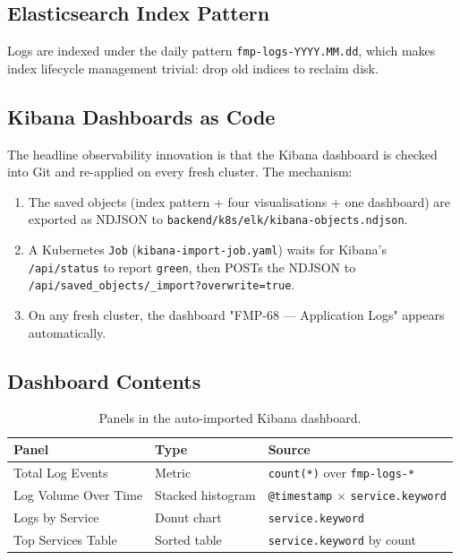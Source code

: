 \documentclass[11pt,a4paper]{article}
\begin{document}
\subsection{Elasticsearch Index Pattern}
Logs are indexed under the daily pattern \texttt{fmp-logs-YYYY.MM.dd},
which makes index lifecycle management trivial: drop old indices to
reclaim disk.

\subsection{Kibana Dashboards as Code}
The headline observability innovation is that the Kibana dashboard
is checked into Git and re-applied on every fresh cluster.  The
mechanism:

\begin{enumerate}[leftmargin=*]
  \item The saved objects (index pattern + four visualisations + one
        dashboard) are exported as NDJSON to
        \texttt{backend/k8s/elk/kibana-objects.ndjson}.
  \item A Kubernetes \texttt{Job}
        (\texttt{kibana-import-job.yaml}) waits for Kibana's
        \texttt{/api/status} to report \texttt{green}, then POSTs
        the NDJSON to
        \texttt{/api/saved\_objects/\_import?overwrite=true}.
  \item On any fresh cluster, the dashboard
        "FMP-68 — Application Logs" appears automatically.
\end{enumerate}

\subsection{Dashboard Contents}
\begin{table}[h]
\centering
\small
\begin{tabular}{l l l}
\toprule
\textbf{Panel} & \textbf{Type} & \textbf{Source} \\
\midrule
Total Log Events       & Metric             & \texttt{count(*)} over \texttt{fmp-logs-*} \\
Log Volume Over Time   & Stacked histogram  & \texttt{@timestamp} $\times$ \texttt{service.keyword} \\
Logs by Service        & Donut chart        & \texttt{service.keyword} \\
Top Services Table     & Sorted table       & \texttt{service.keyword} by count \\
\bottomrule
\end{tabular}
\caption{Panels in the auto-imported Kibana dashboard.}
\end{table}
\end{document}
